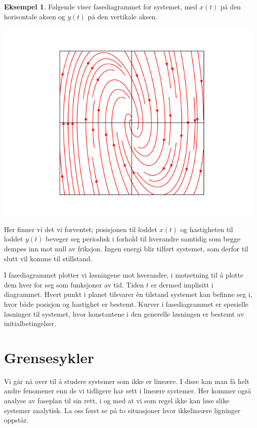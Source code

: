 \documentclass{article}
\theoremstyle{plain}
\theoremstyle{definition}
\newtheorem{eksempel}[teorem]{Eksempel}
\theoremstyle{remark}
\begin{document}
\begin{eksempel}
    Følgende viser fasediagrammet for systemet, med $x(t)$ på den horisontale aksen og $y(t)$ på den vertikale aksen.
    \begin{center}
        \includegraphics[scale=0.5]{phase_plane_1.png}
    \end{center}
    Her finner vi det vi forventet; posisjonen til loddet $x(t)$ og hastigheten til loddet $y(t)$ beveger seg periodisk i forhold til hverandre samtidig som begge dempes inn mot null av friksjon. Ingen energi blir tilført systemet, som derfor til slutt vil komme til stillstand.
\end{eksempel}

I fasediagrammet plotter vi løsningene mot hverandre, i motsetning til å plotte dem hver for seg som funksjoner av tid. Tiden $t$ er dermed implisitt i diagrammet. Hvert punkt i planet tilsvarer én tilstand systemet kan befinne seg i, hvor både posisjon og hastighet er bestemt. Kurver i fasediagrammet er spesielle løsninger til systemet, hvor konstantene i den generelle løsningen er bestemt av initialbetingelser.

\section*{Grensesykler}

Vi går nå over til å studere systemer som ikke er lineære. I disse kan man få helt andre fenomener enn de vi tidligere har sett i lineære systemer. Her kommer også analyse av faseplan til sin rett, i og med at vi som regel ikke kan løse slike systemer analytisk. La oss først se på to situasjoner hvor ikkelineære ligninger oppstår.
\end{document}

